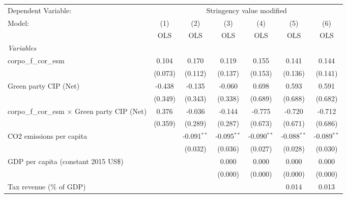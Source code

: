 
\begingroup
\centering
\begin{tabular}{lcccccc}
   \toprule
   Dependent Variable: & \multicolumn{6}{c}{Stringency value modified}\\
   Model:                                                & (1)     & (2)           & (3)           & (4)           & (5)           & (6)\\  
                                                         &  OLS    & OLS           & OLS           & OLS           & OLS           & OLS\\  
   \midrule
   \emph{Variables}\\
   corpo\_f\_cor\_esm                                    & 0.104   & 0.170         & 0.119         & 0.155         & 0.141         & 0.144\\   
                                                         & (0.073) & (0.112)       & (0.137)       & (0.153)       & (0.136)       & (0.141)\\   
   Green party CIP (Net)                                 & -0.438  & -0.135        & -0.060        & 0.698         & 0.593         & 0.591\\   
                                                         & (0.349) & (0.343)       & (0.338)       & (0.689)       & (0.688)       & (0.682)\\   
   corpo\_f\_cor\_esm $\times$ Green party CIP (Net)     & 0.376   & -0.036        & -0.144        & -0.775        & -0.720        & -0.712\\   
                                                         & (0.359) & (0.289)       & (0.287)       & (0.673)       & (0.671)       & (0.686)\\   
   CO2 emissions per capita                              &         & -0.091$^{**}$ & -0.095$^{**}$ & -0.090$^{**}$ & -0.088$^{**}$ & -0.089$^{**}$\\   
                                                         &         & (0.032)       & (0.036)       & (0.027)       & (0.028)       & (0.030)\\   
   GDP per capita (constant 2015 US\$)                   &         &               & 0.000         & 0.000         & 0.000         & 0.000\\   
                                                         &         &               & (0.000)       & (0.000)       & (0.000)       & (0.000)\\   
   Tax revenue (\% of GDP)                               &         &               &               &               & 0.014         & 0.013\\   

\end{tabular}
